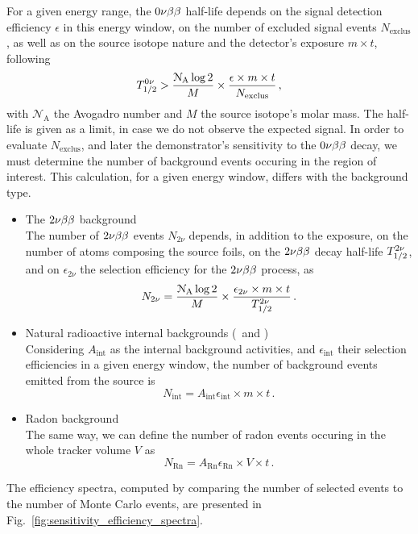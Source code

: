 For a given energy range, the $0\nu\beta\beta$ half-life depends on the signal detection efficiency $\epsilon$ in this energy window, on the number of excluded signal events $N_{\text{exclus}}$, as well as on the source isotope nature and the detector's exposure $m\times t$, following
\begin{equation}
  T_{1/2}^{0\nu} > \frac{\mathcal{N}_{\text{A}}\log{2}}{M}\times \frac{\epsilon\times m\times t}{N_{\text{exclus}}}\,,
\end{equation}
with $\mathcal{N}_{\text{A}}$ the Avogadro number and $M$ the source isotope's molar mass.
The half-life is given as a limit, in case we do not observe the expected signal.
In order to evaluate $N_{\text{exclus}}$, and later the demonstrator's sensitivity to the $0\nu\beta\beta$ decay, we must determine the number of background events occuring in the region of interest.
This calculation, for a given energy window, differs with the background type.
\begin{itemize}
\item The $2\nu\beta\beta$ background\\
  The number of $2\nu\beta\beta$ events $N_{2\nu}$ depends, in addition to the exposure, on the number of atoms composing the source foils, on the $2\nu\beta\beta$ decay half-life $T_{1/2}^{2\nu}$, and on $\epsilon_{2\nu}$ the selection efficiency for the $2\nu\beta\beta$ process, as
  \begin{equation}
    N_{2\nu} = \frac{\mathcal{N}_{\text{A}}\log{2}}{M}\times\frac{\epsilon_{2\nu}\times m\times t}{T_{1/2}^{2\nu}}\,.
  \end{equation}
\item Natural radioactive internal backgrounds (\Tl\ and \Bi)\\
  Considering $A_{\text{int}}$ as the internal background activities, and $\epsilon_{\text{int}}$ their selection efficiencies in a given energy window, the number of background events emitted from the source is
  \begin{equation}
    N_{\text{int}} = A_{\text{int}}\epsilon_{\text{int}}\times m\times t\,.
  \end{equation}
\item Radon background\\
  The same way, we can define the number of radon events occuring in the whole tracker volume $V$ as
  \begin{equation}
    N_{\text{Rn}} = A_{\text{Rn}}\epsilon_{\text{Rn}}\times V\times t\,.
  \end{equation}
\end{itemize}
The efficiency spectra, computed by comparing the number of selected events to the number of Monte Carlo events, are presented in Fig.~\ref{fig:sensitivity_efficiency_spectra}.
